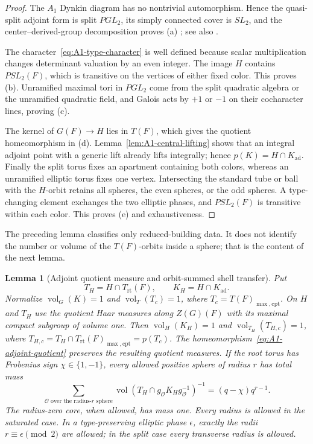 \documentclass[11pt]{article}
\newtheorem{lemma}[theorem]{Lemma}
\theoremstyle{definition}
\theoremstyle{remark}
\newcommand{\rt}{\mathrm{rt}}
\newcommand{\ad}{\mathrm{ad}}
\newcommand{\vol}{\operatorname{vol}}
\begin{document}
\begin{proof}
The $A_1$ Dynkin diagram has no nontrivial automorphism.  Hence the
quasi-split adjoint form is split $PGL_2$, its simply connected cover is
$SL_2$, and the center--derived-group decomposition proves (a)
\cite[Proposition~20.32 and Theorem~23.51]{MilneAlgebraicGroups}; see also
\cite[Appendix~C.4]{ConradReductiveGroups}.

The character~\eqref{eq:A1-type-character} is well defined because scalar
multiplication changes determinant valuation by an even integer.  The image
$H$ contains $PSL_2(F)$, which is transitive on the vertices of either fixed
color.  This proves (b).  Unramified maximal tori in $PGL_2$ come from the
split quadratic algebra or the unramified quadratic field, and Galois acts
by $+1$ or $-1$ on their cocharacter lines, proving (c).

The kernel of $G(F)\to H$ lies in $T(F)$, which gives the quotient
homeomorphism in (d).  Lemma~\ref{lem:A1-central-lifting} shows that an
integral adjoint point with a generic lift already lifts integrally; hence
$p(K)=H\cap K_{\ad}$.  Finally the split torus fixes an apartment containing
both colors, whereas an unramified elliptic torus fixes one vertex.
Intersecting the standard tube or ball with the $H$-orbit retains all
spheres, the even spheres, or the odd spheres.  A type-changing element
exchanges the two elliptic phases, and $PSL_2(F)$ is transitive within each
color.  This proves (e) and exhaustiveness.
\end{proof}

The preceding lemma classifies only reduced-building data.  It does not
identify the number or volume of the $T(F)$-orbits inside a sphere; that is
the content of the next lemma.

\begin{lemma}[Adjoint quotient measure and orbit-summed shell transfer]
\label{lem:A1-shell-transfer}
Put
\[
 T_H=H\cap T_{\rt}(F),\qquad K_H=H\cap K_{\ad}.
\]
Normalize $\vol_G(K)=1$ and $\vol_T(T_c)=1$, where
$T_c=T(F)_{\max,\mathrm{cpt}}$.  On $H$ and $T_H$ use the quotient
Haar measures along $Z(G)(F)$ with its maximal compact subgroup of
volume one.  Then $\vol_H(K_H)=1$ and $\vol_{T_H}(T_{H,c})=1$, where
$T_{H,c}=T_H\cap T_{\rt}(F)_{\max,\mathrm{cpt}}=p(T_c)$.
The homeomorphism~\eqref{eq:A1-adjoint-quotient} preserves the resulting
quotient measures.  If the root
torus has Frobenius sign $\chi\in\{1,-1\}$, every allowed positive sphere of
radius $r$ has total mass
\begin{equation}
 \sum_{\mathcal O\text{ over the radius-}r\text{ sphere}}
 \vol(T_H\cap g_{\mathcal O}K_Hg_{\mathcal O}^{-1})^{-1}
 =(q-\chi)q^{r-1}.
 \label{eq:A1-orbit-summed-shell}
\end{equation}
The radius-zero core, when allowed, has mass one.  Every radius is allowed in
the saturated case.  In a type-preserving elliptic phase $\epsilon$, exactly
the radii $r\equiv\epsilon\pmod2$ are allowed; in the split case every
transverse radius is allowed.
\end{lemma}
\end{document}
